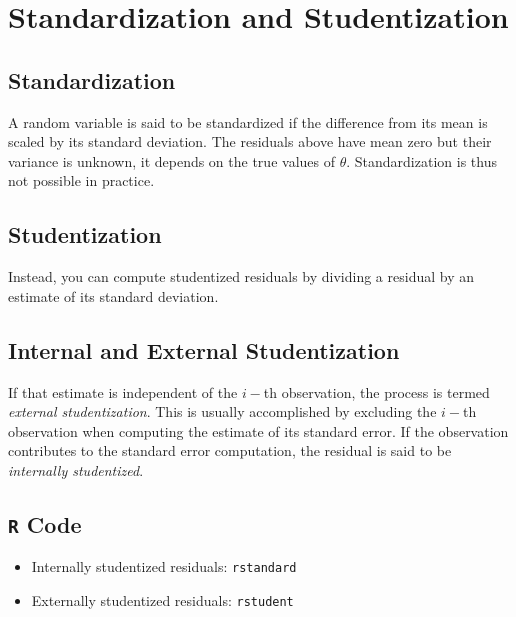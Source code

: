 \documentclass[residuals.tex]{subfiles}
\begin{document}
\Large


\newpage
\section{Standardization and Studentization}
\subsection{Standardization} %

A random variable is said to be standardized if the difference from its mean is scaled by its standard deviation. The residuals above have mean zero but their variance is unknown, it depends on the true values of $\theta$. Standardization is thus not possible in practice.

\subsection{Studentization} %
Instead, you can compute studentized residuals by dividing a residual by an estimate of its standard deviation. 

\subsection{Internal and External Studentization} %
If that estimate is independent of the $i-$th observation, the process is termed \emph{external studentization}. This is usually accomplished by excluding the $i-$th observation when computing the estimate of its standard error. If the observation contributes to the
standard error computation, the residual is said to be \emph{internally studentized}.


\subsection*{\texttt{R} Code}
\begin{itemize}
\item Internally studentized residuals: \texttt{rstandard}
\item Externally studentized residuals: \texttt{rstudent}
\end{itemize}

\end{document}
